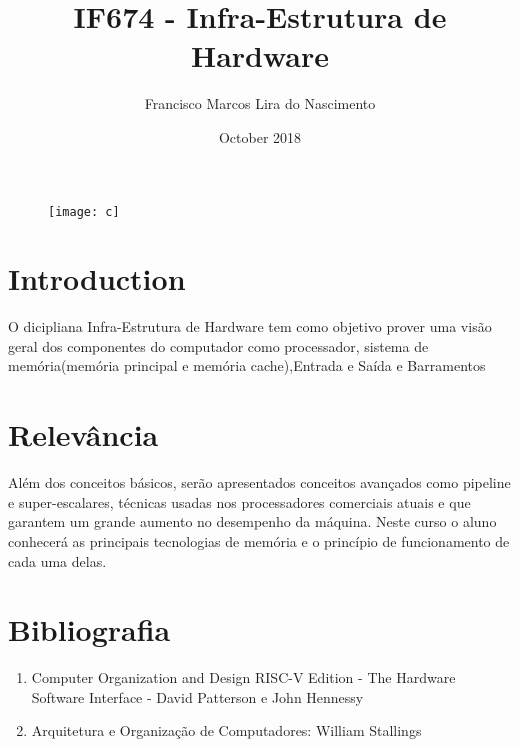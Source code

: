 \documentclass{article}
\title{IF674 - Infra-Estrutura de Hardware}
\author{Francisco Marcos Lira do Nascimento}
\date{October 2018}
\begin{document}
\maketitle

\begin{figure}[h!]
  \centering
  \texttt{[image: c]}
  \caption{}\cite{c}
\end{figure}

\section{Introduction}
O dicipliana Infra-Estrutura de Hardware tem como objetivo prover uma visão geral dos componentes do computador como processador, sistema de memória(memória principal e memória cache),Entrada e Saída e Barramentos\citep{a}

\section{Relevância}
Além dos conceitos básicos, serão apresentados conceitos avançados como pipeline e super-escalares, técnicas usadas nos processadores comerciais atuais e que garantem um grande aumento no desempenho da máquina. Neste curso o aluno conhecerá as principais tecnologias de memória e o princípio de funcionamento de cada uma delas.

\section{Bibliografia}
\begin{enumerate}
\item Computer Organization and Design RISC-V Edition - The Hardware Software Interface - David Patterson e John Hennessy\cite{b}
\item Arquitetura e Organização de Computadores: William Stallings \cite{d}

\end{enumerate}

\section{}
\end{document}
